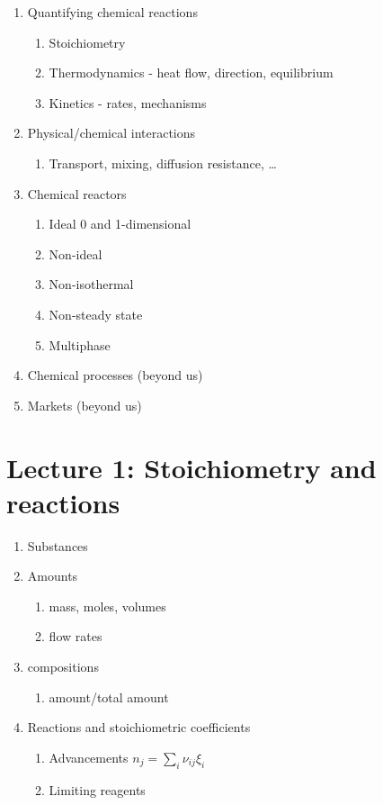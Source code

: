 \documentclass[11pt]{article}
\begin{document}
\begin{enumerate}
\begin{enumerate}
\item Quantifying chemical reactions
\begin{enumerate}
\item Stoichiometry
\item Thermodynamics - heat flow, direction, equilibrium
\item Kinetics - rates, mechanisms
\end{enumerate}
\item Physical/chemical interactions
\begin{enumerate}
\item Transport, mixing, diffusion resistance, \ldots{}
\end{enumerate}
\item Chemical reactors
\begin{enumerate}
\item Ideal 0 and 1-dimensional
\item Non-ideal
\item Non-isothermal
\item Non-steady state
\item Multiphase
\end{enumerate}
\item Chemical processes (beyond us)
\item Markets (beyond us)
\end{enumerate}
\end{enumerate}

\section{Lecture 1: Stoichiometry and reactions}
\label{sec:org9befc62}
\begin{enumerate}
\item Substances
\item Amounts
\begin{enumerate}
\item mass, moles, volumes
\item flow rates
\end{enumerate}
\item compositions
\begin{enumerate}
\item amount/total amount
\end{enumerate}
\item Reactions and stoichiometric coefficients
\begin{enumerate}
\item Advancements \(n_j = \sum_i \nu_{ij} \xi_i\)
\item Limiting reagents
\end{enumerate}
\end{enumerate}
\end{document}
